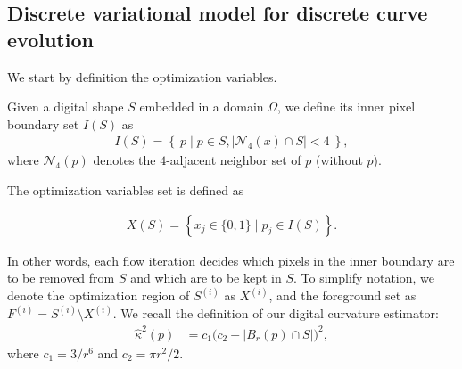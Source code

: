 \documentclass[smallextended]{svjour3}       %
\begin{document}
\subsection{Discrete variational model for discrete curve evolution}

We start by definition the optimization variables.
\begin{definition}
Given a digital shape $S$ embedded in a domain $\Omega$, we define its inner pixel boundary set $I(S)$ as
\begin{align*}
	I(S) = \left\{ \: p \; | \; p \in S, |\mathcal{N}_4(x) \cap S|<4 \: \right\},
\end{align*}
where $\mathcal{N}_4(p)$ denotes the $4$-adjacent neighbor set of $p$ (without $p$).
\end{definition}

The optimization variables set is defined as

\begin{align*}
	X(S) = \left\{ x_j \in \{0,1\} \; | \; p_j \in I(S) \right \}.
\end{align*}

In other words, each flow iteration decides which pixels in the inner boundary are to be removed from $S$ and which are to be kept in $S$. To simplify notation, we denote the optimization region of $S^{(i)}$ as $X^{(i)}$, and the foreground set as $F^{(i)} = S^{(i)} \setminus X^{(i)}$. We recall the definition of our digital curvature estimator:
\begin{align}
	\hat{\kappa}^2(p) &= c_1\Big( c_2 - | B_r(p) \cap S | \Big)^2, 
	\label{eq:curvature-estimator-pixels}
\end{align}
where $c_1=3/r^6$ and $c_2=\pi r^2/2$. 
\end{document}
